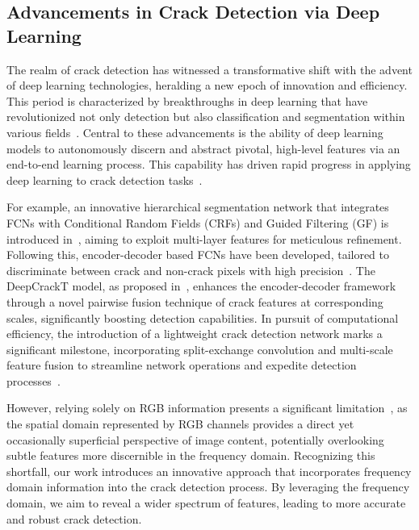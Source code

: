 \documentclass[journal]{IEEEtran}
\begin{document}
\subsection{Advancements in Crack Detection via Deep Learning}

The realm of crack detection has witnessed a transformative shift with the advent of deep learning technologies, heralding a new epoch of innovation and efficiency. This period is characterized by breakthroughs in deep learning that have revolutionized not only detection but also classification and segmentation within various fields~\cite{Hu2025,DBLP:journals/pami/ChenLLSWZ21,KUANG2024100146,PENG2025100170}. Central to these advancements is the ability of deep learning models to autonomously discern and abstract pivotal, high-level features via an end-to-end learning process. 
This capability has driven rapid progress in applying deep learning to crack detection tasks~\cite{DBLP:journals/cacie/RodriguezLozanoGPO23, DBLP:journals/cacie/ZhouZG23}.



For example, an innovative hierarchical segmentation network that integrates FCNs with Conditional Random Fields (CRFs) and Guided Filtering (GF) is introduced in~\cite{DBLP:journals/ijon/LiuYLXL19}, aiming to exploit multi-layer features for meticulous refinement. Following this, encoder-decoder based FCNs have been developed, tailored to discriminate between crack and non-crack pixels with high precision~\cite{DBLP:journals/LD}. The DeepCrackT model, as proposed in~\cite{DBLP:journals/tip/ZouZLQWW19}, enhances the encoder-decoder framework through a novel pairwise fusion technique of crack features at corresponding scales, significantly boosting detection capabilities. In pursuit of computational efficiency, the introduction of a lightweight crack detection network marks a significant milestone, incorporating split-exchange convolution and multi-scale feature fusion to streamline network operations and expedite detection processes~\cite{DBLP:journals/tiv/ZhouQJ23}.

However, relying solely on RGB information presents a significant limitation~\cite{ZHUANG2025100194}, as the spatial domain represented by RGB channels provides a direct yet occasionally superficial perspective of image content, potentially overlooking subtle features more discernible in the frequency domain. Recognizing this shortfall, our work introduces an innovative approach that incorporates frequency domain information into the crack detection process. By leveraging the frequency domain, we aim to reveal a wider spectrum of features, leading to more accurate and robust crack detection.
\end{document}
